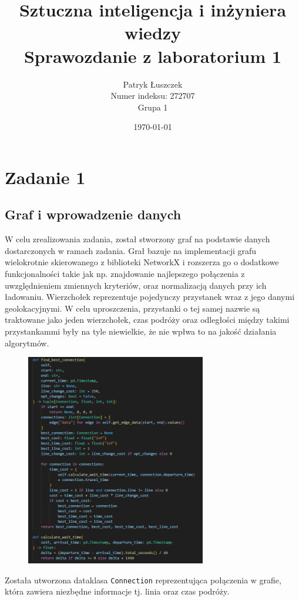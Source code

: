 \documentclass{article}
\title{Sztuczna inteligencja i inżyniera wiedzy\\
        Sprawozdanie z laboratorium 1}
\author{Patryk Łuszczek \\
        Numer indeksu: 272707
        \\ Grupa 1}
\date{\today}
\begin{document}
\maketitle

\section{Zadanie 1}
\subsection*{Graf i wprowadzenie danych}
W celu zrealizowania zadania, został stworzony graf na podstawie danych dostarczonych w ramach zadania.
Grał bazuje na implementacji grafu wielokrotnie skierowanego z biblioteki NetworkX i rozszerza go o dodatkowe funkcjonalności takie jak np. znajdowanie najlepszego połączenia z uwzględnieniem zmiennych kryteriów, oraz normalizacją
danych przy ich ładowaniu. Wierzchołek reprezentuje pojedynczy przystanek wraz z jego danymi geolokacyjnymi. W celu uproszczenia, przystanki o tej samej nazwie są traktowane jako jeden wierzchołek, czas podróży oraz odległości między takimi przystankammi były na tyle niewielkie,
że nie wpłwa to na jakość działania algorytmów.

\begin{figure}[H]
    \centering
    \includegraphics[width=0.7\textwidth]{sc1.png}
\end{figure}

Została utworzona dataklasa \texttt{Connection} reprezentująca połączenia w grafie, która zawiera niezbędne informacje tj. linia oraz czas podróży.
\end{document}
